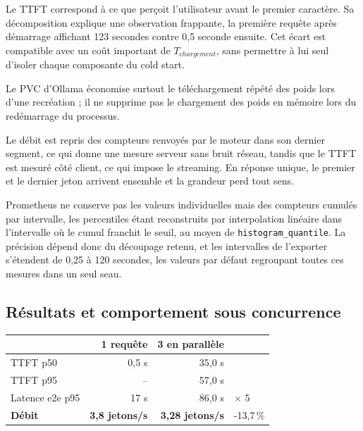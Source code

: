\documentclass[10pt,a4paper]{article}
\begin{document}
Le TTFT correspond à ce que perçoit l'utilisateur avant le premier caractère.
Sa décomposition explique une observation frappante, la première requête après
démarrage affichant 123 secondes contre 0,5 seconde ensuite. Cet écart est
compatible avec un coût important de $T_{chargement}$, sans permettre à lui
seul d'isoler chaque composante du cold start.

Le PVC d'Ollama économise surtout le téléchargement répété des poids lors
d'une recréation ; il ne supprime pas le chargement des poids en mémoire lors
du redémarrage du processus.

Le débit est repris des compteurs renvoyés par le moteur dans son dernier
segment, ce qui donne une mesure serveur sans bruit réseau, tandis que le TTFT
est mesuré côté client, ce qui impose le streaming. En réponse unique, le
premier et le dernier jeton arrivent ensemble et la grandeur perd tout sens.

Prometheus ne conserve pas les valeurs individuelles mais des compteurs
cumulés par intervalle, les percentiles étant reconstruits par interpolation
linéaire dans l'intervalle où le cumul franchit le seuil, au moyen de
\texttt{histogram\_quantile}. La précision dépend donc du découpage retenu, et
les intervalles de l'exporter s'étendent de 0,25 à 120 secondes, les valeurs
par défaut regroupant toutes ces mesures dans un seul seau.

\subsection{Résultats et comportement sous concurrence}

\begin{center}
\small
\renewcommand{\arraystretch}{1.02}
\begin{tabular}{@{}lrrl@{}}
\toprule
&
\textbf{1 requête}
&
\textbf{3 en parallèle}
&
\\
\midrule
TTFT p50
& 0,5 s
& 35,0 s
& \\

TTFT p95
& --
& 57,0 s
& \\

Latence e2e p95
& 17 s
& 86,0 s
& \textcolor{accent}{$\times$ 5} \\

\textbf{Débit}
& \textbf{3,8 jetons/s}
& \textbf{3,28 jetons/s}
& \textcolor{vert}{-13,7\,\%} \\
\bottomrule
\end{tabular}
\end{center}
\end{document}
